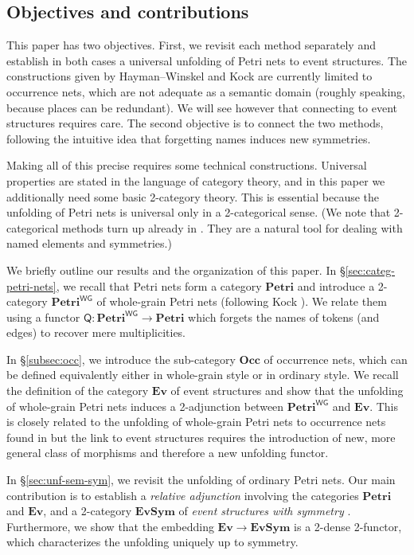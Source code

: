 \documentclass[11pt,a4paper]{article}
\theoremstyle{plain}
\theoremstyle{definition}
\theoremstyle{remark}
\newcommand{\Occ}{\mathbf{Occ}}
\newcommand{\Petri}{\mathbf{Petri}}
\newcommand{\WGPetri}{\mathbf{Petri}^{\mathsf{WG}}}
\newcommand{\ES}{\mathbf{Ev}}
\newcommand{\SES}{\mathbf{EvSym}}
\newcommand{\Q}{\mathsf{Q}}
\begin{document}
\subsection{Objectives and contributions}

This paper has two objectives. First, we revisit each method separately and
establish in both cases a universal unfolding of Petri nets to event structures.
The constructions given by Hayman--Winskel \cite{GENUN} and Kock \cite{WGPN} are
currently limited to occurrence nets, which are not adequate as a semantic
domain (roughly speaking, because places can be redundant). We will see however that connecting to event structures requires care. The second objective is to connect the two methods, following the intuitive idea that
forgetting names induces new symmetries.

 Making all of this precise requires some technical constructions. Universal
 properties are stated in the language of category theory, and in this paper we
 additionally need some basic 2-category theory. This is essential because
 the unfolding of Petri nets is universal only in a 2-categorical sense. (We
 note that 2-categorical methods turn up already in \cite{GENUN,WGPN,ESS}. They are a natural tool for dealing with named elements and symmetries.)

 We briefly outline our results and the organization of this paper. In
 \S\ref{sec:categ-petri-nets}, we recall that Petri nets form a category
 $\Petri$ and introduce a 2-category $\WGPetri$ of whole-grain Petri nets
(following Kock \cite{WGPN}).  We relate them using a functor
 $\Q : \WGPetri \to \Petri$ which forgets the names of tokens (and edges) to recover mere multiplicities. 
 
 In \S\ref{subsec:occ}, we introduce the
 sub-category $\Occ$ of occurrence nets, which can be defined equivalently either
 in whole-grain style or in ordinary style. We recall the definition of the category $\ES$ of event structures and show that the unfolding of
         whole-grain Petri nets induces a 2-adjunction between $\WGPetri$ and $\ES$. This is closely related to the unfolding of whole-grain
         Petri nets to occurrence nets found in  \cite{WGPN} but the link to event
         structures requires the introduction of new, more general class of morphisms and therefore a new unfolding functor.

In \S\ref{sec:unf-sem-sym}, we revisit the unfolding of ordinary Petri nets. Our main contribution is to establish a \emph{relative adjunction} \cite{RM} involving the
         categories $\Petri$ and $\ES$, and a 2-category $\SES$ of \emph{event
         structures with symmetry} \cite{ESS}. Furthermore, we show that
         the embedding $\ES \to \SES$ is a 2-dense 2-functor, which characterizes the unfolding uniquely up to symmetry.
\end{document}
